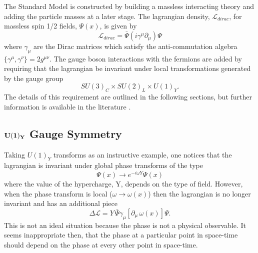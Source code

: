 The Standard Model is constructed by building a massless interacting theory and adding the particle masses at a later stage. The lagrangian density, $\mathcal{L}_{dirac}$, for massless spin 1/2 fields, $\Psi(x)$, is given by
\begin{equation}\label{diracL}
\mathcal{L}_{dirac} = \bar{\Psi}\left( i \gamma^{\mu}\partial_{\mu} \right) \Psi
\end{equation}
where $\gamma_{\mu}$ are the Dirac matrices which satisfy the anti-commutation algebra $\{\gamma^{\mu}, 
\gamma^{\nu} \} = 2g^{\mu \nu}$.
The gauge boson interactions with the fermions are added by requiring that the lagrangian be invariant under local transformations generated by the gauge group
\begin{equation}
 SU(3)_C \times SU(2)_L \times U(1)_Y .
 \end{equation}
The details of this requirement are outlined in the following sections, but further information is available in the literature \cite{Halzen:1984mc,Ellis:1991qj,Mandl:1985bg,Ross:1999gw}.


\subsection{$\bold{U(1)_Y}$ Gauge Symmetry}

Taking $U(1)_Y$ transforms as an instructive example, one notices that the lagrangian is invariant under global phase transforms of the type
\begin{equation} \label{u1}
\Psi(x) \rightarrow e^{-i\omega Y}\Psi(x)
\end{equation}
where the value of the hypercharge, Y, depends on the type of field.
However, when the phase transform is local ($\omega \rightarrow \omega(x)$) then the lagrangian is no longer invariant and has an additional piece
\begin{equation}
\Delta \mathcal{L} = Y \, \bar{\Psi} \gamma_{\mu} \left[\partial_{\mu} \, \omega(x) \right] \Psi .
\end{equation}
This is not an ideal situation because the phase is not a physical observable. It seems inappropriate then, that the phase at a particular point in space-time should depend on 
the phase at  every other point in space-time. 


